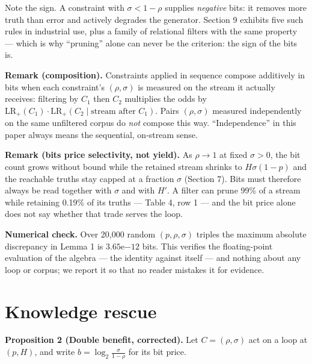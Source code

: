 \documentclass[11pt]{article}
\begin{document}
Note the sign. A constraint with $\sigma < 1-\rho$ supplies \emph{negative}
bits: it removes more truth than error and actively degrades the generator.
Section 9 exhibits five such rules in industrial use, plus a family of
relational filters with the same property --- which is why ``pruning'' alone
can never be the criterion: the sign of the bits is.

\medskip
\noindent\textbf{Remark (composition).} Constraints applied in sequence
compose additively in bits when each constraint's $(\rho, \sigma)$ is
measured on the stream it actually receives: filtering by $C_1$ then $C_2$
multiplies the odds by $\mathrm{LR}_+(C_1) \cdot \mathrm{LR}_+(C_2 \mid
\text{stream after } C_1)$. Pairs $(\rho, \sigma)$ measured independently on
the same unfiltered corpus do \emph{not} compose this way. ``Independence''
in this paper always means the sequential, on-stream sense.

\medskip
\noindent\textbf{Remark (bits price selectivity, not yield).} As
$\rho \to 1$ at fixed $\sigma > 0$, the bit count grows without bound while
the retained stream shrinks to $H\sigma(1-p)$ and the reachable truths stay
capped at a fraction $\sigma$ (Section 7). Bits must therefore always be
read together with $\sigma$ and with $H'$. A filter can prune 99\% of a
stream while retaining 0.19\% of its truths --- Table 4, row 1 --- and the
bit price alone does not say whether that trade serves the loop.

\medskip
\noindent\textbf{Numerical check.} Over 20,000 random $(p, \rho, \sigma)$
triples the maximum absolute discrepancy in Lemma 1 is $3.65\mathrm{e}{-12}$
bits. This verifies the floating-point evaluation of the algebra --- the
identity against itself --- and nothing about any loop or corpus; we report
it so that no reader mistakes it for evidence.

\section{Knowledge rescue}

\noindent\textbf{Proposition 2 (Double benefit, corrected).} Let
$C = (\rho, \sigma)$ act on a loop at $(p, H)$, and write
$b = \log_2 \frac{\sigma}{1-\rho}$ for its bit price.
\end{document}
